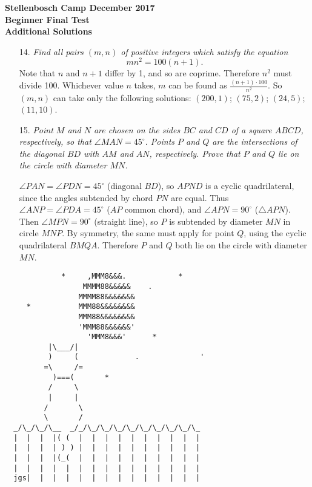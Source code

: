 \documentclass[a4paper,12pt]{article}
\begin{document}
\begin{center}
\textbf{Stellenbosch Camp December 2017 \\ Beginner Final Test} \\
\textbf{Additional Solutions}
\end{center}


\begin{enumerate}
  
  \item[14.] \emph{Find all pairs $(m,n)$ of positive integers which satisfy the equation
  \[ mn^2 = 100(n+1). \]}  
  Note that $n$ and $n+1$ differ by 1, and so are coprime. Therefore $n^2$ must divide 100. Whichever value $n$ takes, $m$ can be found as $\frac{(n+1)\cdot100}{n^2}$. So $(m,n)$ can take only the following solutions: $(200,1)$; $(75,2)$; $(24,5)$; $(11,10)$.
  
  \item[15.] \emph{Point $M$ and $N$ are chosen on the sides $BC$ and $CD$ of a square $ABCD$, respectively, so that $\angle MAN = 45^\circ$. Points $P$ and $Q$ are the intersections of the diagonal $BD$ with $AM$ and $AN$, respectively. Prove that $P$ and $Q$ lie on the circle with diameter $MN$.}
  
  $\angle PAN=\angle PDN = 45^\circ$ (diagonal $BD$), so $APND$ is a cyclic quadrilateral, since the angles subtended by chord $PN$ are equal. Thus $\angle ANP= \angle PDA = 45^\circ$ ($AP$ common chord), and $\angle APN=90^\circ$ ($\triangle APN$). Then $\angle MPN=90^\circ$ (straight line), so $P$ is subtended by diameter $MN$ in circle $MNP$. By symmetry, the same must apply for point $Q$, using the cyclic quadrilateral $BMQA$. Therefore $P$ and $Q$ both lie on the circle with diameter $MN$.

  
\end{enumerate}


\vspace{1cm}
\centering
\begin{BVerbatim}
             *     ,MMM8&&&.            *
                  MMMM88&&&&&    .
                 MMMM88&&&&&&&
     *           MMM88&&&&&&&&
                 MMM88&&&&&&&&
                 'MMM88&&&&&&'
                   'MMM8&&&'      *
          |\___/|
          )     (             .              '
         =\     /=
           )===(       *
          /     \
          |     |
         /       \
         \       /
  _/\_/\_/\__  _/_/\_/\_/\_/\_/\_/\_/\_/\_/\_
  |  |  |  |( (  |  |  |  |  |  |  |  |  |  |
  |  |  |  | ) ) |  |  |  |  |  |  |  |  |  |
  |  |  |  |(_(  |  |  |  |  |  |  |  |  |  |
  |  |  |  |  |  |  |  |  |  |  |  |  |  |  |
  jgs|  |  |  |  |  |  |  |  |  |  |  |  |  |
\end{BVerbatim}
\end{document}
